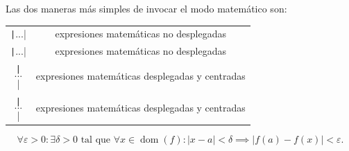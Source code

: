 \begin{frame}
	\frametitle{\secname}

	Las dos maneras más simples de invocar el modo matemático son:

	\begin{table}[ht!]
		\centering
		\begin{tabular}{cc}
			\texttt|$...$|                                   & expresiones matemáticas no desplegadas          \\
			\texttt|\begin{math}...\end{math}|               & expresiones matemáticas no desplegadas          \\
			\texttt|\[...\]|                                 & expresiones matemáticas desplegadas y centradas \\
			\texttt|\begin{displaymath}...\end{displaymath}| & expresiones matemáticas desplegadas y centradas \\
		\end{tabular}
	\end{table}

	\begin{equation*}
		\forall\varepsilon>0:\exists\delta>0\text{ tal que }
		\forall x\in\operatorname{dom}\left(f\right):
		\left|x-a\right|<\delta\implies\left|f\left(a\right)-f\left(x\right)\right|<\varepsilon.
	\end{equation*}


\end{frame}
